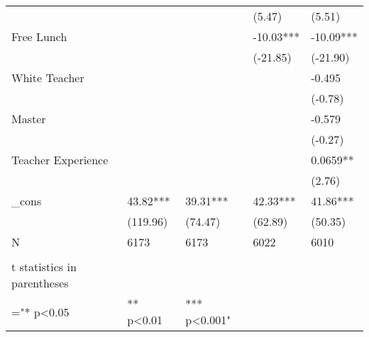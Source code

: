 \documentclass{article}
\begin{document}
\begin{table}[htbp]
\begin{tabular}{lrllrr}
          &       &       &       & \multicolumn{1}{l}{(5.47)} & \multicolumn{1}{l}{(5.51)} \\
    \multicolumn{2}{l}{Free Lunch} &       &       & \multicolumn{1}{l}{-10.03***} & \multicolumn{1}{l}{-10.09***} \\
          &       &       &       & \multicolumn{1}{l}{(-21.85)} & \multicolumn{1}{l}{(-21.90)} \\
    \multicolumn{2}{l}{White Teacher} &       &       & \multicolumn{1}{l}{} & \multicolumn{1}{l}{-0.495} \\
          &       &       &       & \multicolumn{1}{l}{} & \multicolumn{1}{l}{(-0.78)} \\
    \multicolumn{2}{l}{Master} &       &       & \multicolumn{1}{l}{} & \multicolumn{1}{l}{-0.579} \\
          &       &       &       & \multicolumn{1}{l}{} & \multicolumn{1}{l}{(-0.27)} \\
    \multicolumn{2}{l}{Teacher Experience} &       &       & \multicolumn{1}{l}{} & \multicolumn{1}{l}{0.0659**} \\
          &       &       &       & \multicolumn{1}{l}{} & \multicolumn{1}{l}{(2.76)} \\
    \multicolumn{2}{l}{\_cons} & 43.82*** & 39.31*** & \multicolumn{1}{l}{42.33***} & \multicolumn{1}{l}{41.86***} \\
          &       & (119.96) & (74.47) & \multicolumn{1}{l}{(62.89)} & \multicolumn{1}{l}{(50.35)} \\
    \multicolumn{2}{l}{N} & 6173  & 6173  & \multicolumn{1}{l}{6022} & \multicolumn{1}{l}{6010} \\
    \midrule
          &       &       &       &       &  \\
    t statistics in parentheses &       &       &       &       &  \\
    ="* p<0.05 &       &  ** p<0.01 &  *** p<0.001" &       &  \\
    \end{tabular}%
  \label{tab:addlabel}%
\end{table}%
\end{document}

